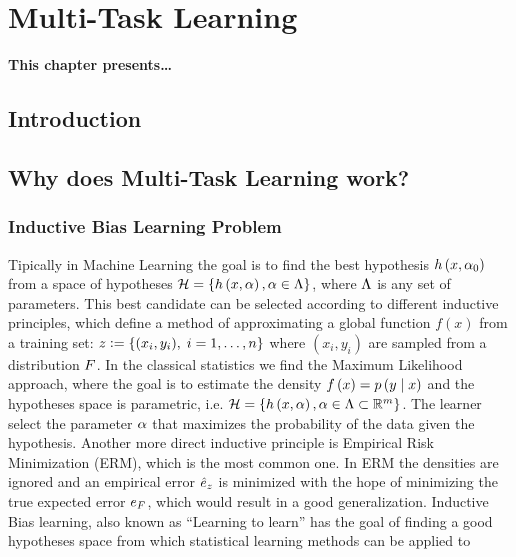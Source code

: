 
\chapter{Multi-Task Learning} %
\label{Chapter2}

{\bf \small{
This chapter presents\dots
}}

\section{Introduction}



\section{Why does Multi-Task Learning work?}
% 
\subsection{Inductive Bias Learning Problem} %
Tipically in Machine Learning the goal is to find the best hypothesis $h\left(x, \alpha_0\right)$ from a space of hypotheses $\mathcal{H} = \left\{h\left(x, \alpha\right), \alpha \in \Lambda\right\}$, where $\Lambda$ is any set of parameters. This best candidate can be selected according to different inductive principles, which define a method of approximating a global function $f(x)$ from a training set:
$ z \vcentcolon= \left\{(x_i, y_i),\; i=1, \ldots, n\right\} $
where $(x_i, y_i)$ are sampled from a distribution $F$.
%
In the classical statistics we find the Maximum Likelihood approach, where the goal is to estimate the density $f\left(x\right) = p\left( y \;\middle\vert\; x \right)$ and the hypotheses space is parametric, i.e. $\mathcal{H} = \left\{h\left(x, \alpha\right), \alpha \in \Lambda \subset \mathbb{R}^m\right\}$. The learner select the parameter $\alpha$ that maximizes the probability of the data given the hypothesis.
%
Another more direct inductive principle is Empirical Risk Minimization (ERM), which is the most common one. In ERM the densities are ignored and an empirical error $\hat{e}_z$ is minimized with the hope of minimizing the true expected error $e_F$, which would result in a good generalization. 
Inductive Bias learning, also known as ``Learning to learn'' has the goal of finding a good hypotheses space from which statistical learning methods can be applied to 

